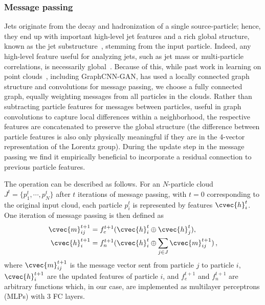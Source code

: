 \subsubsection{Message passing}

Jets originate from the decay and hadronization of a single source-particle; hence, they end up with important high-level jet features and a rich global structure, known as the jet substructure~\cite{larkoski2020jet}, stemming from the input particle. 
Indeed, any high-level feature useful for analyzing jets, such as jet mass or multi-particle correlations, is necessarily global~\cite{Komiske:2017aww}.  
Because of this, while past work in learning on point clouds~\cite{dynamicgraphcnn, monti2017geometric, Qu:2019gqs}, including GraphCNN-GAN, has used a locally connected graph structure and convolutions for message passing, we choose a fully connected graph, equally weighting messages from all particles in the clouds. 
Rather than subtracting particle features for messages between particles, useful in graph convolutions to capture local differences within a neighborhood, the respective features are concatenated to preserve the global structure (the difference between particle features is also only physically meaningful if they are in the 4-vector representation of the Lorentz group). 
During the update step in the message passing we find it empirically beneficial to incorporate a residual connection to previous particle features.

The operation can be described as follows. 
For an $N$-particle cloud $J^t = \{p_1^t, \cdots, p_N^t\}$ after $t$ iterations of message passing, with $t=0$ corresponding to the original input cloud, each particle $p^t_i$ is represented by features $\cvec{h}^t_i$.
One iteration of message passing is then defined as
\begin{align}
        \label{eqn:mpm} \cvec{m}^{t+1}_{ij} &= f_e^{t+1}(\cvec{h}^t_i \oplus \cvec{h}^t_j), \\
        \label{eqn:mph} \cvec{h}^{t+1}_i &= f_n^{t+1}(\cvec{h}^t_i \oplus \sum_{j \in J} \cvec{m}^{t+1}_{ij})\,,
\end{align}
where $\cvec{m}^{t+1}_{ij}$ is the message vector sent from particle $j$ to particle $i$, $\cvec{h}^{t+1}_i$ are the updated features of particle $i$, and $f_e^{t+1}$ and $f_n^{t+1}$ are arbitrary functions which, in our case, are implemented as multilayer perceptrons (MLPs) with 3 FC layers.


